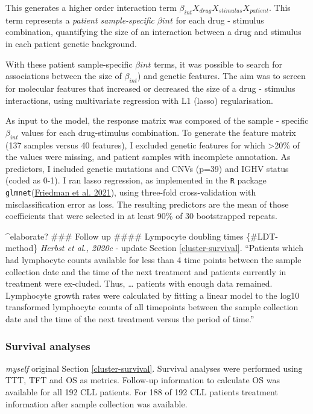 \documentclass[11pt, a4paper, twosided]{book}
\begin{document}
This generates a higher order interaction term \(\beta_{int}X_{drug}X_{stimulus}X_{patient}\). This term represents a \emph{patient sample-specific} \(\beta{int}\) for each drug - stimulus combination, quantifying the size of an interaction between a drug and stimulus in each patient genetic background.

With these patient sample-specific \(\beta{int}\) terms, it was possible to search for associations between the size of \(\beta_{int}\)) and genetic features. The aim was to screen for molecular features that increased or decreased the size of a drug - stimulus interactions, using multivariate regression with L1 (lasso) regularisation.

As input to the model, the response matrix was composed of the sample - specific \(\beta_{int}\) values for each drug-stimulus combination. To generate the feature matrix (137 samples versus 40 features), I excluded genetic features for which \textgreater20\% of the values were missing, and patient samples with incomplete annotation. As predictors, I included genetic mutations and CNVs (p=39) and IGHV status (coded as 0-1). I ran lasso regression, as implemented in the \texttt{R} package \texttt{glmnet}(\protect\hyperlink{ref-R-glmnet}{Friedman et al. 2021}), using three-fold cross-validation with misclassification error as loss. The resulting predictors are the mean of those coefficients that were selected in at least 90\% of 30 bootstrapped repeats.

\^{}elaborate?
\#\#\# Follow up
\#\#\#\# Lympocyte doubling times \{\#LDT-method\}
\emph{Herbst et al., 2020c} - update
Section \ref{cluster-survival}. ``Patients which had lymphocyte counts available for less than 4 time points between the sample
collection date and the time of the next treatment and patients currently in treatment were ex-cluded. Thus, \ldots{} patients with enough data remained. Lymphocyte growth rates were calculated by fitting a linear model to the log10 transformed lymphocyte counts of all timepoints between the sample collection date and the time of the next treatment versus the period of time.''

\hypertarget{survival-method}{%
\subsubsection{Survival analyses}\label{survival-method}}

\emph{myself} original
Section \ref{cluster-survival}. Survival analyses were performed using TTT, TFT and OS as metrics. Follow-up information to calculate OS was available for all 192 CLL patients. For 188 of 192 CLL patients treatment information after sample collection was available.
\end{document}
